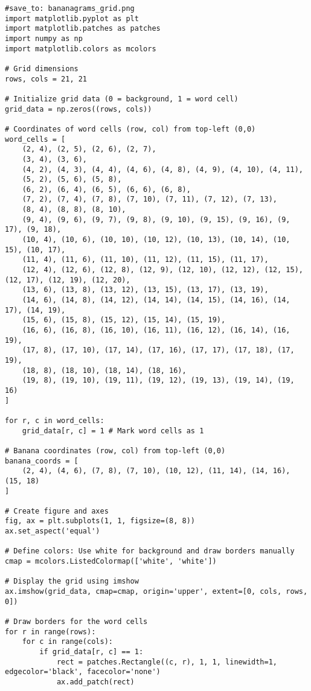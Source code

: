 \documentclass[11pt]{article}
\begin{document}
\begin{verbatim}
#save_to: bananagrams_grid.png
import matplotlib.pyplot as plt
import matplotlib.patches as patches
import numpy as np
import matplotlib.colors as mcolors

# Grid dimensions
rows, cols = 21, 21

# Initialize grid data (0 = background, 1 = word cell)
grid_data = np.zeros((rows, cols))

# Coordinates of word cells (row, col) from top-left (0,0)
word_cells = [
    (2, 4), (2, 5), (2, 6), (2, 7),
    (3, 4), (3, 6),
    (4, 2), (4, 3), (4, 4), (4, 6), (4, 8), (4, 9), (4, 10), (4, 11),
    (5, 2), (5, 6), (5, 8),
    (6, 2), (6, 4), (6, 5), (6, 6), (6, 8),
    (7, 2), (7, 4), (7, 8), (7, 10), (7, 11), (7, 12), (7, 13),
    (8, 4), (8, 8), (8, 10),
    (9, 4), (9, 6), (9, 7), (9, 8), (9, 10), (9, 15), (9, 16), (9, 17), (9, 18),
    (10, 4), (10, 6), (10, 10), (10, 12), (10, 13), (10, 14), (10, 15), (10, 17),
    (11, 4), (11, 6), (11, 10), (11, 12), (11, 15), (11, 17),
    (12, 4), (12, 6), (12, 8), (12, 9), (12, 10), (12, 12), (12, 15), (12, 17), (12, 19), (12, 20),
    (13, 6), (13, 8), (13, 12), (13, 15), (13, 17), (13, 19),
    (14, 6), (14, 8), (14, 12), (14, 14), (14, 15), (14, 16), (14, 17), (14, 19),
    (15, 6), (15, 8), (15, 12), (15, 14), (15, 19),
    (16, 6), (16, 8), (16, 10), (16, 11), (16, 12), (16, 14), (16, 19),
    (17, 8), (17, 10), (17, 14), (17, 16), (17, 17), (17, 18), (17, 19),
    (18, 8), (18, 10), (18, 14), (18, 16),
    (19, 8), (19, 10), (19, 11), (19, 12), (19, 13), (19, 14), (19, 16)
]

for r, c in word_cells:
    grid_data[r, c] = 1 # Mark word cells as 1

# Banana coordinates (row, col) from top-left (0,0)
banana_coords = [
    (2, 4), (4, 6), (7, 8), (7, 10), (10, 12), (11, 14), (14, 16), (15, 18)
]

# Create figure and axes
fig, ax = plt.subplots(1, 1, figsize=(8, 8))
ax.set_aspect('equal')

# Define colors: Use white for background and draw borders manually
cmap = mcolors.ListedColormap(['white', 'white'])

# Display the grid using imshow
ax.imshow(grid_data, cmap=cmap, origin='upper', extent=[0, cols, rows, 0])

# Draw borders for the word cells
for r in range(rows):
    for c in range(cols):
        if grid_data[r, c] == 1:
            rect = patches.Rectangle((c, r), 1, 1, linewidth=1, edgecolor='black', facecolor='none')
            ax.add_patch(rect)


\end{verbatim}
\end{document}
